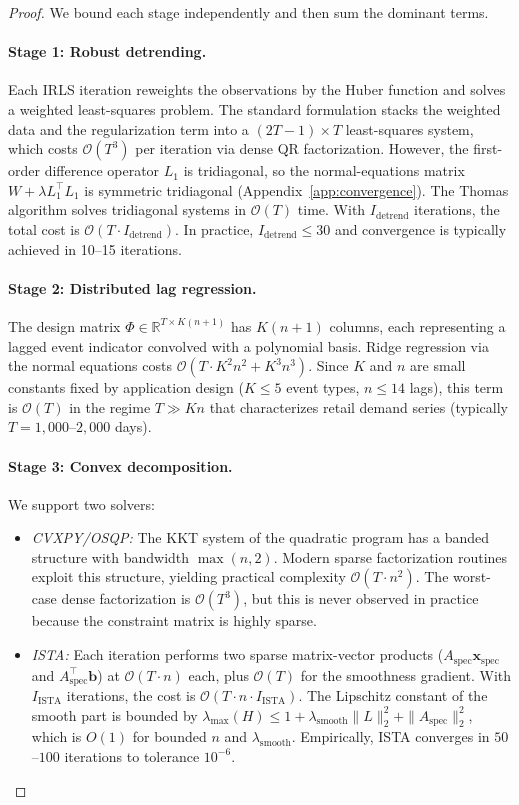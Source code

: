 \documentclass[10pt]{article} %
\theoremstyle{plain}
\theoremstyle{definition}
\newcommand{\R}{\mathbb{R}}
\newcommand{\xspec}{\mathbf{x}_{\text{spec}}}
\newcommand{\Aspec}{A_{\text{spec}}}
\newcommand{\bvec}{\mathbf{b}}
\begin{document}
\begin{proof}
We bound each stage independently and then sum the dominant terms.

\paragraph{Stage 1: Robust detrending.} Each IRLS iteration reweights the observations by the Huber function and solves a weighted least-squares problem. The standard formulation stacks the weighted data and the regularization term into a $(2T-1) \times T$ least-squares system, which costs $\mathcal{O}(T^3)$ per iteration via dense QR factorization. However, the first-order difference operator $L_1$ is tridiagonal, so the normal-equations matrix $W + \lambda L_1^\top L_1$ is symmetric tridiagonal (Appendix~\ref{app:convergence}). The Thomas algorithm solves tridiagonal systems in $\mathcal{O}(T)$ time. With $I_{\text{detrend}}$ iterations, the total cost is $\mathcal{O}(T \cdot I_{\text{detrend}})$. In practice, $I_{\text{detrend}} \leq 30$ and convergence is typically achieved in 10--15 iterations.

\paragraph{Stage 2: Distributed lag regression.} The design matrix $\Phi \in \R^{T \times K(n+1)}$ has $K(n+1)$ columns, each representing a lagged event indicator convolved with a polynomial basis. Ridge regression via the normal equations costs $\mathcal{O}(T \cdot K^2 n^2 + K^3 n^3)$. Since $K$ and $n$ are small constants fixed by application design ($K \leq 5$ event types, $n \leq 14$ lags), this term is $\mathcal{O}(T)$ in the regime $T \gg Kn$ that characterizes retail demand series (typically $T = 1{,}000$--$2{,}000$ days).

\paragraph{Stage 3: Convex decomposition.} We support two solvers:
\begin{itemize}
\item \textit{CVXPY/OSQP:} The KKT system of the quadratic program has a banded structure with bandwidth $\max(n, 2)$. Modern sparse factorization routines exploit this structure, yielding practical complexity $\mathcal{O}(T \cdot n^2)$. The worst-case dense factorization is $\mathcal{O}(T^3)$, but this is never observed in practice because the constraint matrix is highly sparse.
\item \textit{ISTA:} Each iteration performs two sparse matrix-vector products ($\Aspec \xspec$ and $\Aspec^\top \bvec$) at $\mathcal{O}(T \cdot n)$ each, plus $\mathcal{O}(T)$ for the smoothness gradient. With $I_{\text{ISTA}}$ iterations, the cost is $\mathcal{O}(T \cdot n \cdot I_{\text{ISTA}})$. The Lipschitz constant of the smooth part is bounded by $\lambda_{\text{max}}(H) \leq 1 + \lambda_{\text{smooth}} \|L\|_2^2 + \|\Aspec\|_2^2$, which is $O(1)$ for bounded $n$ and $\lambda_{\text{smooth}}$. Empirically, ISTA converges in $50$--$100$ iterations to tolerance $10^{-6}$.
\end{itemize}


\end{proof}
\end{document}
